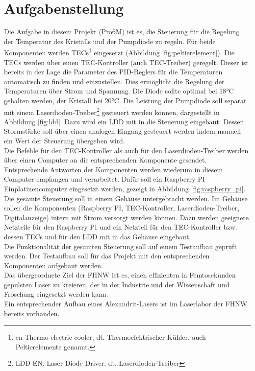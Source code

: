 \documentclass[a4paper,10pt]{scrartcl}
\begin{document}
\section{Aufgabenstellung}
Die Aufgabe in diesem Projekt (Pro6M) ist es,  die Steuerung für die Regelung der Temperatur des Kristalls und der Pumpdiode zu regeln. Für beide Komponenten werden TECs\footnote{en Thermo electric cooler, dt. Thermoelektrischer Kühler, auch Peltierelemente genannt.} eingesetzt (Abbildung \ref{fig:peltierelement}).  Die TECs werden über einen TEC-Kontroller (auch TEC-Treiber) geregelt. Dieser ist bereits in der Lage  die Parameter des PID-Reglers für die Temperaturen automatisch zu finden und einzustellen. Dies ermöglicht die Regelung der Temperaturen über Strom und Spannung. Die Diode sollte optimal bei 18°C gehalten werden, der Kristall bei 20°C.
Die Leistung der Pumpdiode soll separat mit einem Laserdioden-Treiber\footnote{LDD EN. Laser Diode Driver, dt. Laserdioden-Treiber} gesteuert werden können, dargestellt in Abbildung \ref{fig:ldd}. Dazu wird ein LDD mit in die Steuerung eingebaut. Dessen Stormstärke soll über einen analogen Eingang gesteuert werden indem manuell ein Wert der Steuerung übergeben wird.\\
Die Befehle für den TEC-Kontroller als auch für den Laserdioden-Treiber werden über einen Computer an die entsprechenden Komponente gesendet. Entsprechende Antworten der Komponenten werden wiederum in diesem Computer empfangen und verarbeitet. Dafür soll ein Raspberry PI Einplatinencomputer eingesetzt werden, gezeigt in Abbildung \ref{fig:raspberry_pi}.\\

Die gesamte Steuerung soll in einem Gehäuse untergebracht werden. Im Gehäuse sollen die Komponenten  (Raspberry PI, TEC-Kontroller, Laserdioden-Treiber, Digitalanzeige) intern mit Strom versorgt werden können. Dazu werden geeignete Netzteile für den Raspberry PI und ein Netzteil für den TEC-Kontroller bzw. dessen TECs und für den LDD mit in das Gehäuse eingebaut.\\
Die Funktionalität der gesamten Steuerung soll auf einem Testaufbau geprüft werden. Der Testaufbau soll für das Projekt mit den entsprechenden Komponenten aufgebaut werden.\\

Das übergeordnete Ziel der FHNW ist es, einen effizienten in Femtosekunden gepulsten Laser zu kreieren, der in der Industrie und der Wissenschaft und Froschung eingesetzt werden kann.\\
Ein entsprechender Aufbau eines Alexandrit-Lasers ist im Laserlabor der FHNW bereits vorhanden.\\
\end{document}
